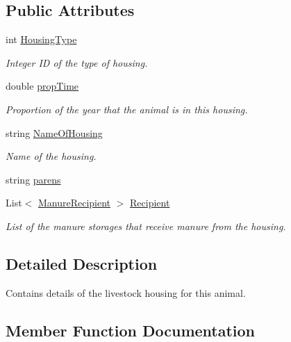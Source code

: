 \subsection*{Public Attributes}
\begin{DoxyCompactItemize}
\item 
int \mbox{\hyperlink{structlivestock_1_1housing_record_a3e532e43462b184a6bcde53c6e7b047b}{Housing\+Type}}
\begin{DoxyCompactList}\small\item\em Integer ID of the type of housing. \end{DoxyCompactList}\item 
double \mbox{\hyperlink{structlivestock_1_1housing_record_aefaaa48895680f2d4f90ad4ca14f2c4e}{prop\+Time}}
\begin{DoxyCompactList}\small\item\em Proportion of the year that the animal is in this housing. \end{DoxyCompactList}\item 
string \mbox{\hyperlink{structlivestock_1_1housing_record_a8a33c1c98dbd03f6a305a87372050d6b}{Name\+Of\+Housing}}
\begin{DoxyCompactList}\small\item\em Name of the housing. \end{DoxyCompactList}\item 
string \mbox{\hyperlink{structlivestock_1_1housing_record_a180d9ab0c1e6023d24500933a2f546f7}{parens}}
\item 
List$<$ \mbox{\hyperlink{structlivestock_1_1_manure_recipient}{Manure\+Recipient}} $>$ \mbox{\hyperlink{structlivestock_1_1housing_record_af8ad1589ea0ef0cac608311c445d1ed5}{Recipient}}
\begin{DoxyCompactList}\small\item\em List of the manure storages that receive manure from the housing. \end{DoxyCompactList}\end{DoxyCompactItemize}


\subsection{Detailed Description}
Contains details of the livestock housing for this animal. 

\subsection{Member Function Documentation}
\mbox{\label{structlivestock_1_1housing_record_a776bdf58427bb435133756bbfa7f5a95}} 
